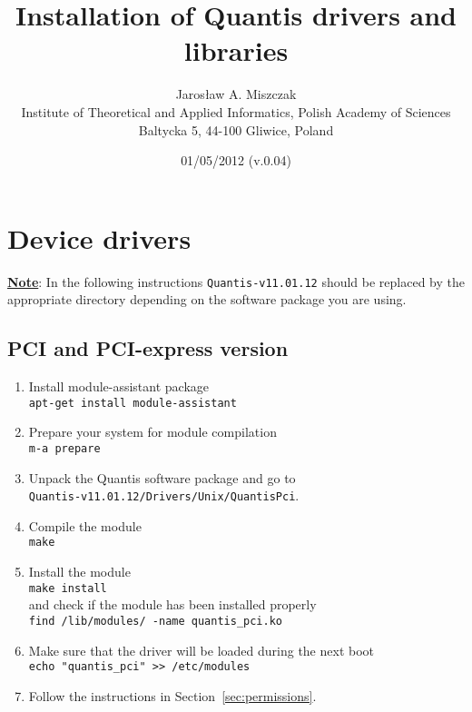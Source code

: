 \documentclass[a4paper,11pt]{article}
\title{Installation of Quantis drivers and libraries}
\author{Jaros{\l}aw A. Miszczak\\
Institute of Theoretical and Applied Informatics, Polish Academy of Sciences\\
Baltycka 5, 44-100 Gliwice, Poland}
\date{01/05/2012 (v.0.04)}
\begin{document}
\maketitle

\section{Device drivers}

\textbf{\underline{Note}}: In the following instructions
\texttt{Quantis-v11.01.12} should be replaced by the appropriate directory
depending on the software package you are using.
\subsection{PCI and PCI-express version}
\begin{enumerate}
    \item Install module-assistant package\\ \texttt{apt-get install
    module-assistant} 
    \item Prepare your system for module compilation\\ \texttt{m-a prepare}
    \item Unpack the Quantis software package and go to\\
    \texttt{Quantis-v11.01.12/Drivers/Unix/QuantisPci}.
    \item Compile the module\\ \texttt{make}
    \item Install the module\\ \texttt{make install}\\ and check if the module
    has been installed properly\\ \texttt{find /lib/modules/ -name
    quantis\_pci.ko}
    \item Make sure that the driver will be loaded during the next boot \\
    \texttt{echo "quantis\_pci" >> /etc/modules}
    \item Follow the instructions in Section~\ref{sec:permissions}.
\end{enumerate}

\end{document}
